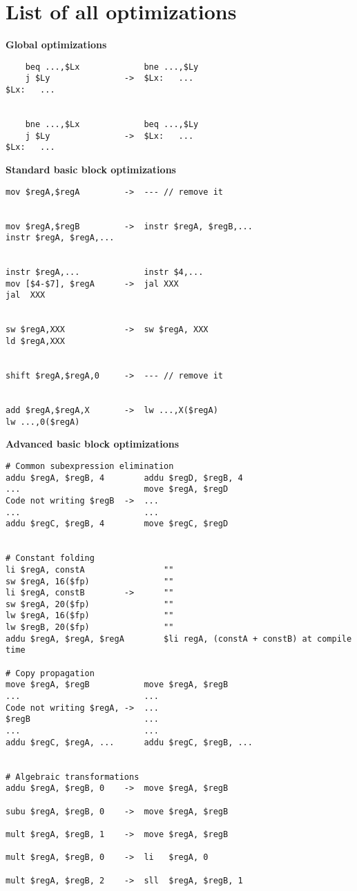 \documentclass[10pt,a4paper]{article}
\begin{document}
\appendix

\section{List of all optimizations}

\label{opt}

\textbf{Global optimizations}

\begin{verbatim}
    beq ...,$Lx             bne ...,$Ly
    j $Ly               ->  $Lx:   ...
$Lx:   ...


    bne ...,$Lx             beq ...,$Ly
    j $Ly               ->  $Lx:   ...
$Lx:   ...
\end{verbatim}
\textbf{Standard basic block optimizations}

\begin{verbatim}
mov $regA,$regA         ->  --- // remove it


mov $regA,$regB         ->  instr $regA, $regB,...
instr $regA, $regA,...


instr $regA,...             instr $4,...
mov [$4-$7], $regA      ->  jal XXX
jal  XXX


sw $regA,XXX            ->  sw $regA, XXX
ld $regA,XXX


shift $regA,$regA,0     ->  --- // remove it


add $regA,$regA,X       ->  lw ...,X($regA)
lw ...,0($regA)
\end{verbatim}
\textbf{Advanced basic block optimizations}

\begin{verbatim}
# Common subexpression elimination
addu $regA, $regB, 4        addu $regD, $regB, 4
...                         move $regA, $regD
Code not writing $regB  ->  ...
...                         ...
addu $regC, $regB, 4        move $regC, $regD


# Constant folding
li $regA, constA                ""       
sw $regA, 16($fp)               ""
li $regA, constB        ->      ""
sw $regA, 20($fp)               ""	
lw $regA, 16($fp)               "" 
lw $regB, 20($fp)               ""
addu $regA, $regA, $regA        $li regA, (constA + constB) at compile time

# Copy propagation
move $regA, $regB           move $regA, $regB
...                         ...
Code not writing $regA, ->  ...
$regB                       ...
...                         ...
addu $regC, $regA, ...      addu $regC, $regB, ...


# Algebraic transformations
addu $regA, $regB, 0    ->  move $regA, $regB

subu $regA, $regB, 0    ->  move $regA, $regB

mult $regA, $regB, 1    ->  move $regA, $regB

mult $regA, $regB, 0    ->  li   $regA, 0

mult $regA, $regB, 2    ->  sll  $regA, $regB, 1
\end{verbatim}
\end{document}
